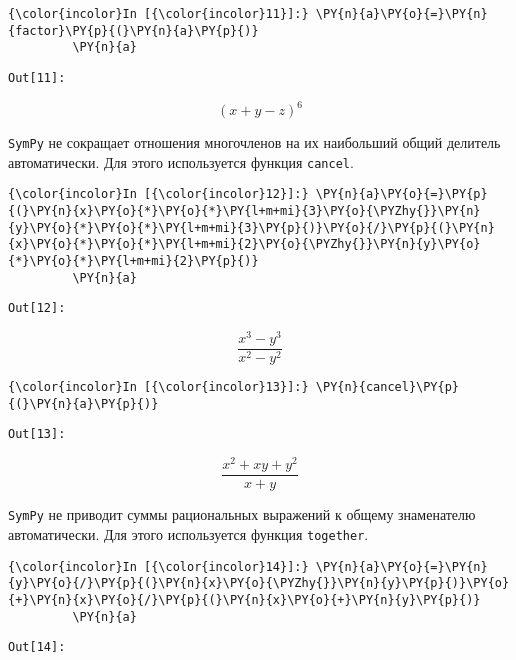     \begin{Verbatim}[commandchars=\\\{\}]
{\color{incolor}In [{\color{incolor}11}]:} \PY{n}{a}\PY{o}{=}\PY{n}{factor}\PY{p}{(}\PY{n}{a}\PY{p}{)}
         \PY{n}{a}
\end{Verbatim}
\texttt{\color{outcolor}Out[{\color{outcolor}11}]:}
    
    \[\left(x + y - z\right)^{6}\]

    

    \texttt{SymPy} не сокращает отношения многочленов на их наибольший общий
делитель автоматически. Для этого используется функция \texttt{cancel}.

    \begin{Verbatim}[commandchars=\\\{\}]
{\color{incolor}In [{\color{incolor}12}]:} \PY{n}{a}\PY{o}{=}\PY{p}{(}\PY{n}{x}\PY{o}{*}\PY{o}{*}\PY{l+m+mi}{3}\PY{o}{\PYZhy{}}\PY{n}{y}\PY{o}{*}\PY{o}{*}\PY{l+m+mi}{3}\PY{p}{)}\PY{o}{/}\PY{p}{(}\PY{n}{x}\PY{o}{*}\PY{o}{*}\PY{l+m+mi}{2}\PY{o}{\PYZhy{}}\PY{n}{y}\PY{o}{*}\PY{o}{*}\PY{l+m+mi}{2}\PY{p}{)}
         \PY{n}{a}
\end{Verbatim}
\texttt{\color{outcolor}Out[{\color{outcolor}12}]:}
    
    \[\frac{x^{3} - y^{3}}{x^{2} - y^{2}}\]

    

    \begin{Verbatim}[commandchars=\\\{\}]
{\color{incolor}In [{\color{incolor}13}]:} \PY{n}{cancel}\PY{p}{(}\PY{n}{a}\PY{p}{)}
\end{Verbatim}
\texttt{\color{outcolor}Out[{\color{outcolor}13}]:}
    
    \[\frac{x^{2} + x y + y^{2}}{x + y}\]

    

    \texttt{SymPy} не приводит суммы рациональных выражений к общему
знаменателю автоматически. Для этого используется функция
\texttt{together}.

    \begin{Verbatim}[commandchars=\\\{\}]
{\color{incolor}In [{\color{incolor}14}]:} \PY{n}{a}\PY{o}{=}\PY{n}{y}\PY{o}{/}\PY{p}{(}\PY{n}{x}\PY{o}{\PYZhy{}}\PY{n}{y}\PY{p}{)}\PY{o}{+}\PY{n}{x}\PY{o}{/}\PY{p}{(}\PY{n}{x}\PY{o}{+}\PY{n}{y}\PY{p}{)}
         \PY{n}{a}
\end{Verbatim}
\texttt{\color{outcolor}Out[{\color{outcolor}14}]:}
    
